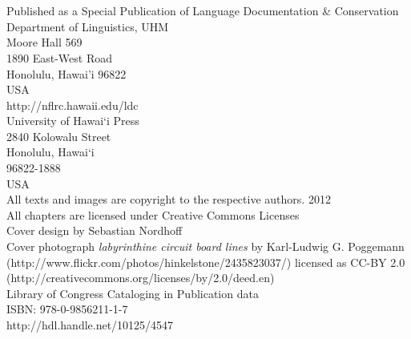 \chapter*{~}
\noindent

\begin{flushleft} 
{\small
Published as a Special Publication of Language Documentation \& Conservation\\
Department of Linguistics, UHM\\
Moore Hall 569\\
1890 East-West Road\\
Honolulu, Hawai'i 96822\\
USA\\
http://nflrc.hawaii.edu/ldc\\
University of Hawai‘i Press\\
2840 Kolowalu Street\\
Honolulu, Hawai‘i\\
96822-1888\\
USA\\
{\textcopyright} All texts and images are copyright to the respective authors. 2012\\
All chapters are licensed under Creative Commons Licenses\\
Cover design by Sebastian Nordhoff\\
Cover photograph {\em labyrinthine circuit board lines} by Karl-Ludwig G. Poggemann (http://www.flickr.com/photos/hinkelstone/2435823037/) licensed as  CC-BY 2.0 (http://creativecommons.org/licenses/by/2.0/deed.en)\\
Library of Congress Cataloging in Publication data\\
ISBN: 978-0-9856211-1-7\\
http://hdl.handle.net/10125/4547\\
} 
\end{flushleft}